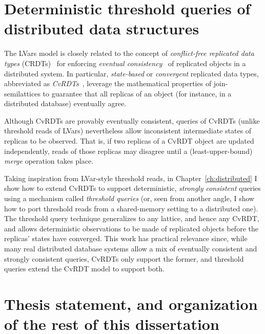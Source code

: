 \section{Deterministic threshold queries of distributed data structures}\label{s:intro-cvrdts}

The LVars model is closely related to the concept of
\emph{conflict-free replicated data types} (CRDTs)~\cite{crdts} for
enforcing \emph{eventual consistency}~\cite{vogels-ec} of replicated
objects in a distributed system.  In particular, \emph{state-based} or
\emph{convergent} replicated data types, abbreviated as
\emph{CvRDTs}~\cite{crdts, crdts-tr}, leverage the mathematical
properties of join-semilattices to guarantee that all replicas of an
object (for instance, in a distributed database) eventually agree.

Although CvRDTs are provably eventually consistent, queries of CvRDTs
(unlike threshold reads of LVars) nevertheless allow inconsistent
intermediate states of replicas to be observed.  That is, if two
replicas of a CvRDT object are updated independently, reads of those
replicas may disagree until a (least-upper-bound) \emph{merge}
operation takes place.

Taking inspiration from LVar-style threshold reads, in
Chapter~\ref{ch:distributed} I show how to extend CvRDTs to support
deterministic, \emph{strongly consistent} queries using a mechanism
called \emph{threshold queries} (or, seen from another angle, I show
how to port threshold reads from a shared-memory setting to a
distributed one).  The threshold query technique generalizes to any
lattice, and hence any CvRDT, and allows deterministic observations to
be made of replicated objects before the replicas' states have
converged.  This work has practical relevance since, while many real
distributed database systems allow a mix of eventually consistent and
strongly consistent queries, CvRDTs only support the former, and
threshold queries extend the CvRDT model to support both.

\section{Thesis statement, and organization of the rest of this dissertation}\label{s:thesis}

